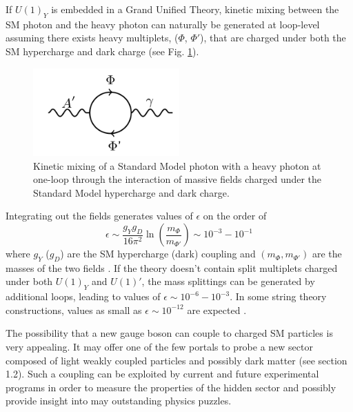 If $U(1)_Y$ is embedded in a Grand Unified Theory, kinetic mixing between the
SM photon and the heavy photon can naturally be generated at loop-level 
assuming there exists heavy multiplets, ($\Phi$, $\Phi'$), 
that are charged under both the SM hypercharge and dark charge 
(see Fig. \ref{fig:ap_loop}).
\begin{figure}
    \centering
    \includegraphics[width=0.5\textwidth]{images/aprime_loop.png}
    \caption{Kinetic mixing of a Standard Model photon with a heavy photon 
    at one-loop through the interaction of massive fields charged under
    the Standard Model hypercharge and dark charge.}
    \label{fig:ap_loop}
\end{figure}
Integrating out the fields generates values of $\epsilon$ on the order of 
\begin{equation}
    \epsilon \sim \frac{g_Yg_D}{16\pi^2}\ln\left(\frac{m_{\Phi}}{m_{\Phi'}} \right)
             \sim 10^{-3} - 10^{-1} 
\end{equation}
where $g_Y$ ($g_D$) are the SM hypercharge (dark) coupling and 
$(m_{\Phi}, m_{\Phi'})$ are the masses of the two fields 
\cite{ArkaniHamed:2008qp, Bjorken:2009mm}.  If the theory doesn't contain 
split multiplets charged under both $U(1)_Y$ and $U(1)'$, the mass splittings 
can be generated by additional loops, leading to values of $\epsilon \sim 10^{-6} - 10^{-3}$. 
In some string theory constructions, 
values as small as $\epsilon \sim 10^{-12}$ are expected 
\cite{Goodsell:2010ie,Goodsell:2009xc, Cicoli:2011yh}.

%
%

The possibility that a new gauge boson can couple to charged SM particles is 
very appealing.  It may offer one of the few portals to probe a new sector 
composed of light weakly coupled particles and possibly dark matter
(see section 1.2).  Such a coupling can be exploited by current and future
experimental programs in order to measure the properties of
the hidden sector and possibly provide insight into may outstanding physics puzzles.

